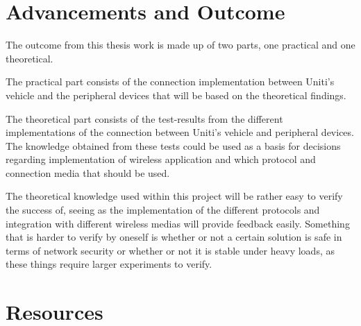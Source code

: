 \documentclass[a4paper]{article}
\begin{document}



\section{Advancements and Outcome}




The outcome from this thesis work is made up of two parts, one practical and one
theoretical.

The practical part consists of the connection implementation between Uniti's
vehicle and the peripheral devices that will be based on the theoretical
findings.

The theoretical part consists of the test-results from the different
implementations of the connection between Uniti's vehicle and peripheral
devices. The knowledge obtained from these tests could be used as a basis for
decisions regarding implementation of wireless application and which protocol
and connection media that should be used.


The theoretical knowledge used within this project will be rather easy
to verify the success of, seeing as the implementation of the different 
protocols and integration with different wireless medias will provide
feedback easily. Something that is harder to verify by oneself is whether
or not a certain solution is safe in terms of network security or whether
or not it is stable under heavy loads, as these things require larger
experiments to verify.

\section{Resources}
\end{document}
